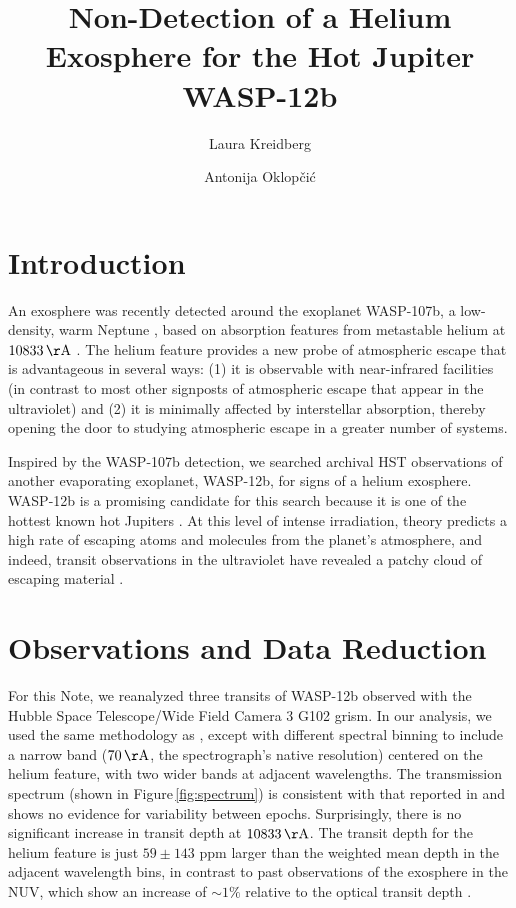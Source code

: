 \documentclass[RNAAS]{aastex62}
\begin{document}
\title{Non-Detection of a Helium Exosphere for the Hot Jupiter WASP-12\lowercase{b}}

\author{Laura Kreidberg}

\author{Antonija Oklop\v{c}i\'{c}}

\section{Introduction}
An exosphere was recently detected around the exoplanet WASP-107b, a
low-density, warm Neptune \citep{spake18}, based on absorption features from metastable helium at $10833\,\mathrm{\AA}$ \citep[predicted
by][]{seager00,oklopcic18}. The helium feature provides a new probe of atmospheric escape that is
advantageous in several ways: (1) it is observable with near-infrared facilities
(in contrast to most other signposts of atmospheric escape that appear in the
ultraviolet) and (2) it is minimally affected by interstellar absorption,
thereby opening the door to studying atmospheric escape in a greater number of systems.

Inspired by the WASP-107b detection, we searched archival HST observations of
another evaporating exoplanet, WASP-12b, for signs of a helium exosphere.
WASP-12b is a promising 
candidate for this search because it is one of the hottest known hot
Jupiters \citep[$T_\mathrm{eq} = 2500$ K;][]{hebb09}. At this level of intense
irradiation, theory predicts a high rate of escaping atoms and molecules from
the planet's atmosphere, and indeed, transit observations in the ultraviolet
have revealed a patchy cloud of escaping material \citep{nichols15, salz16}.  

\section{Observations and Data Reduction}
For this Note, we reanalyzed three transits of WASP-12b observed with the
Hubble Space Telescope/Wide Field Camera 3 G102 grism.  In our analysis, we used the same methodology as
\cite{kreidberg15b}, except with different spectral binning to include a narrow
band ($70\,\mathrm{\AA}$, the spectrograph's native resolution) centered on the
helium feature, with two wider bands at adjacent wavelengths. 
The transmission spectrum (shown in Figure\,\ref{fig:spectrum}) is consistent with that reported in
\cite{kreidberg15b} and shows no evidence for variability between epochs.  Surprisingly, there
is no significant increase in transit depth at $10833\,\mathrm{\AA}$. The
transit depth for the helium feature is just $59 \pm 143$ ppm larger than the
weighted mean depth in the adjacent wavelength bins, in contrast to past
observations of the exosphere in the NUV, which show an increase of $\sim1\%$
relative to the optical transit depth \citep{nichols15}.
\end{document}
